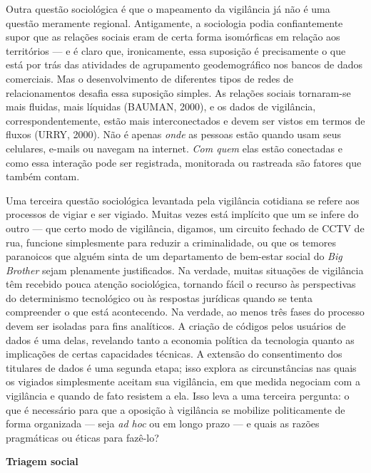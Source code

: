 Outra questão sociológica é que o mapeamento da vigilância já não é uma
questão meramente regional. Antigamente, a sociologia podia
confiantemente supor que as relações sociais eram de certa forma
isomórficas em relação aos territórios --- e é claro que, ironicamente,
essa suposição é precisamente o que está por trás das atividades de
agrupamento geodemográfico nos bancos de dados comerciais. Mas o
desenvolvimento de diferentes tipos de redes de relacionamentos desafia
essa suposição simples. As relações sociais tornaram-se mais fluidas,
mais líquidas (BAUMAN, 2000), e os dados de vigilância,
correspondentemente, estão mais interconectados e devem ser vistos em
termos de fluxos (URRY, 2000). Não é apenas \emph{onde} as pessoas estão
quando usam seus celulares, e-mails ou navegam na internet. \emph{Com
quem} elas estão conectadas e como essa interação pode ser registrada,
monitorada ou rastreada são fatores que também contam.

Uma terceira questão sociológica levantada pela vigilância cotidiana se
refere aos processos de vigiar e ser vigiado. Muitas vezes está
implícito que um se infere do outro --- que certo modo de vigilância,
digamos, um circuito fechado de CCTV de rua, funcione simplesmente para
reduzir a criminalidade, ou que os temores paranoicos que alguém sinta
de um departamento de bem-estar social do \emph{Big Brother} sejam
plenamente justificados. Na verdade, muitas situações de vigilância têm
recebido pouca atenção sociológica, tornando fácil o recurso às
perspectivas do determinismo tecnológico ou às respostas jurídicas
quando se tenta compreender o que está acontecendo. Na verdade, ao menos
três fases do processo devem ser isoladas para fins analíticos. A
criação de códigos pelos usuários de dados é uma delas, revelando tanto
a economia política da tecnologia quanto as implicações de certas
capacidades técnicas. A extensão do consentimento dos titulares de dados
é uma segunda etapa; isso explora as circunstâncias nas quais os
vigiados simplesmente aceitam sua vigilância, em que medida negociam com
a vigilância e quando de fato resistem a ela. Isso leva a uma terceira
pergunta: o que é necessário para que a oposição à vigilância se
mobilize politicamente de forma organizada --- seja \emph{ad hoc} ou em
longo prazo --- e quais as razões pragmáticas ou éticas para fazê-lo?

\textbf{Triagem social}

